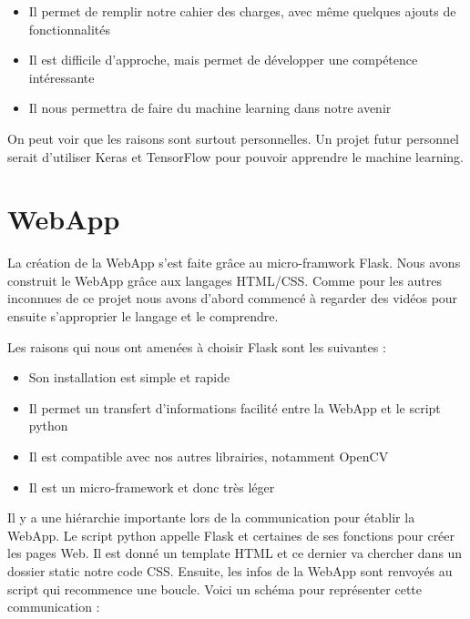 \documentclass[
	a4paper,									%
	11pt,										%
	twoside,									%
	openright,									%
	notitlepage,									%
	parskip=half,								%
]{scrreprt}										%
\begin{document}
\begin{itemize}
	\item Il permet de remplir notre cahier des charges, avec même quelques ajouts de fonctionnalités
	\item Il est difficile d'approche, mais permet de développer une compétence intéressante
	\item Il nous permettra de faire du machine learning dans notre avenir
\end{itemize}

On peut voir que les raisons sont surtout personnelles. Un projet futur personnel serait d'utiliser Keras et TensorFlow
pour pouvoir apprendre le machine learning. \par

\section{WebApp}

La création de la WebApp s'est faite grâce au micro-framwork Flask. Nous avons construit le WebApp grâce aux langages 
HTML/CSS. Comme pour les autres inconnues de ce projet nous avons d'abord commencé à regarder des vidéos pour ensuite
s'approprier le langage et le comprendre. \par

Les raisons qui nous ont amenées à choisir Flask sont les suivantes : 

\begin{itemize}
	\item Son installation est simple et rapide 
	\item Il permet un transfert d'informations facilité entre la WebApp et le script python
	\item Il est compatible avec nos autres librairies, notamment OpenCV
	\item Il est un micro-framework et donc très léger
\end{itemize}

Il y a une hiérarchie importante lors de la communication pour établir la WebApp. Le script python appelle Flask et certaines 
de ses fonctions pour créer les pages Web. Il est donné un template HTML et ce dernier va chercher dans un dossier static 
notre code CSS. Ensuite, les infos de la WebApp sont renvoyés au script qui recommence une boucle. 
Voici un schéma pour représenter cette communication : 
\end{document}
